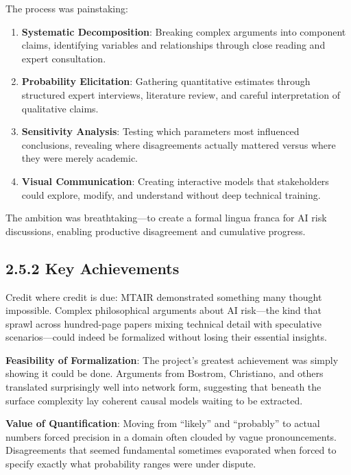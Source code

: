 \documentclass[
  11pt,
  letterpaper,
]{book}
\providecommand{\tightlist}{%
  \setlength{\itemsep}{0pt}\setlength{\parskip}{0pt}}
\begin{document}
The process was painstaking:

\begin{enumerate}
\def\labelenumi{\arabic{enumi}.}
\tightlist
\item
  \textbf{Systematic Decomposition}: Breaking complex arguments into
  component claims, identifying variables and relationships through
  close reading and expert consultation.
\item
  \textbf{Probability Elicitation}: Gathering quantitative estimates
  through structured expert interviews, literature review, and careful
  interpretation of qualitative claims.
\item
  \textbf{Sensitivity Analysis}: Testing which parameters most
  influenced conclusions, revealing where disagreements actually
  mattered versus where they were merely academic.
\item
  \textbf{Visual Communication}: Creating interactive models that
  stakeholders could explore, modify, and understand without deep
  technical training.
\end{enumerate}

The ambition was breathtaking---to create a formal lingua franca for AI
risk discussions, enabling productive disagreement and cumulative
progress.

\subsection{2.5.2 Key Achievements}\label{sec-mtair-achievements}

Credit where credit is due: MTAIR demonstrated something many thought
impossible. Complex philosophical arguments about AI risk---the kind
that sprawl across hundred-page papers mixing technical detail with
speculative scenarios---could indeed be formalized without losing their
essential insights.

\textbf{Feasibility of Formalization}: The project's greatest
achievement was simply showing it could be done. Arguments from Bostrom,
Christiano, and others translated surprisingly well into network form,
suggesting that beneath the surface complexity lay coherent causal
models waiting to be extracted.

\textbf{Value of Quantification}: Moving from ``likely'' and
``probably'' to actual numbers forced precision in a domain often
clouded by vague pronouncements. Disagreements that seemed fundamental
sometimes evaporated when forced to specify exactly what probability
ranges were under dispute.
\end{document}
